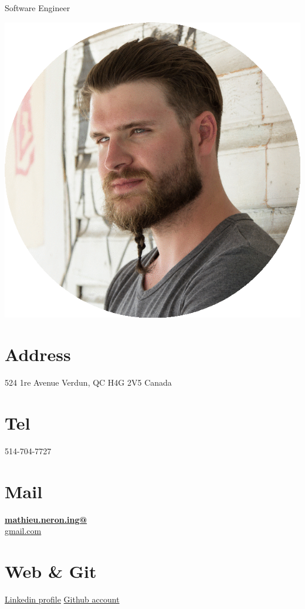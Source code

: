 \documentclass[]{friggeri-cv}
\begin{document}
      {Software Engineer}
      

\begin{aside}
  \includegraphics[scale=0.18]{img/mathieu.png}
  \section{Address}
    524 1re Avenue
    Verdun, QC
    H4G 2V5
    Canada
    ~
  \section{Tel}
    514-704-7727
    ~
  \section{Mail}
    \href{mailto:mathieu.neron.ing@gmail.com}{\textbf{mathieu.neron.ing@}\\gmail.com}
    ~
  \section{Web \& Git}
    \href{https://ca.linkedin.com/in/mathieu-n\%C3\%A9ron-b4419522}{Linkedin profile}
\href{https://github.com/mathieu-neron}{Github account}
    ~

\end{aside}
\end{document}
